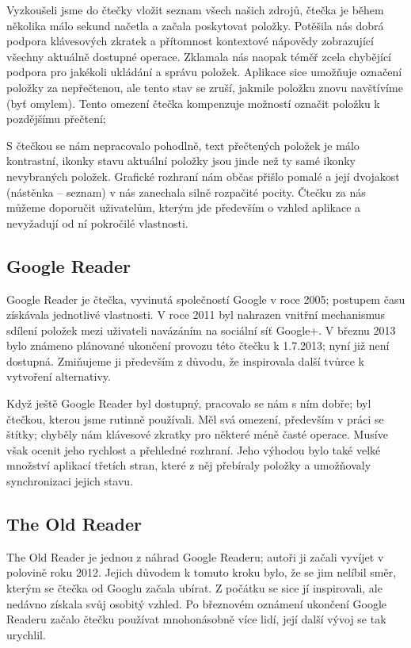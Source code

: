 Vyzkoušeli jsme do čtečky vložit seznam všech našich zdrojů, čtečka je během několika málo sekund načetla a začala poskytovat položky.
Potěšila nás dobrá podpora klávesových zkratek a přítomnost kontextové nápovědy zobrazující všechny aktuálně dostupné operace.
Zklamala nás naopak téměř zcela chybějící podpora pro jakékoli ukládání a správu položek.
Aplikace sice umožňuje označení položky za nepřečtenou, ale tento stav se zruší, jakmile položku znovu navštívíme (byť omylem).
Tento omezení čtečka kompenzuje možností označit položku k pozdějšímu přečtení; 

S čtečkou se nám nepracovalo pohodlně, text přečtených položek je málo kontrastní, ikonky stavu aktuální položky jsou jinde než ty samé ikonky nevybraných položek.
Grafické rozhraní nám občas přišlo pomalé a její dvojakost (nástěnka -- seznam) v nás zanechala silně rozpačité pocity.
Čtečku za nás můžeme doporučit uživatelům, kterým jde především o vzhled aplikace a nevyžadují od ní pokročilé vlastnosti.

\subsection{Google Reader}

Google Reader je čtečka, vyvinutá společností Google v roce 2005; postupem času získávala jednotlivé vlastnosti.
V roce 2011 byl nahrazen vnitřní mechanismus sdílení položek mezi uživateli navázáním na sociální síť Google+.
V březnu 2013 bylo známeno plánované ukončení provozu této čtečku k 1.7.2013; nyní již není dostupná.
Zmiňujeme ji především z důvodu, že inspirovala další tvůrce k vytvoření alternativy.

Když ještě Google Reader byl dostupný, pracovalo se nám s ním dobře; byl čtečkou, kterou jsme rutinně používali.
Měl svá omezení, především v práci se štítky; chyběly nám klávesové zkratky pro některé méně časté operace.
Musíve však ocenit jeho rychlost a přehledné rozhraní.
Jeho výhodou bylo také velké množství aplikací třetích stran, které z něj přebíraly položky a umožňovaly synchronizaci jejich stavu.

\subsection{The Old Reader}

The Old Reader je jednou z náhrad Google Readeru; autoři ji začali vyvíjet v polovině roku 2012.
Jejich důvodem k tomuto kroku bylo, že se jim nelíbil směr, kterým se čtečka od Googlu začala ubírat.
Z počátku se sice jí inspirovali, ale nedávno získala svůj osobitý vzhled.
Po březnovém oznámení ukončení Google Readeru začalo čtečku používat mnohonásobně více lidí, její další vývoj se tak urychlil.

